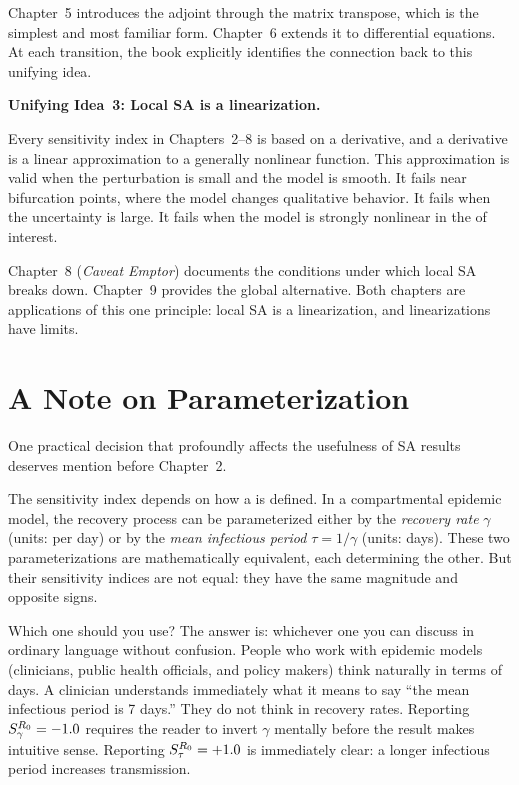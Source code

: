 Chapter~5 introduces the adjoint through the matrix transpose,
which is the simplest and most familiar form. Chapter~6 extends
it to differential equations. At each transition, the book
explicitly identifies the connection back to this unifying idea.

\medskip

\noindent\textbf{Unifying Idea~3: Local SA is a linearization.}

Every sensitivity index in Chapters~2--8 is based on a derivative,
and a derivative is a linear approximation to a generally nonlinear
function. This approximation is valid when the perturbation is small
and the model is smooth. It fails near bifurcation points, where
the model changes qualitative behavior. It fails when the \POI
uncertainty is large. It fails when the model is strongly nonlinear
in the \POI of interest.

Chapter~8 (\emph{Caveat Emptor}) documents the conditions
under which local SA breaks down. Chapter~9 provides
the global alternative. Both chapters are applications
of this one principle: local SA is a linearization,
and linearizations have limits.

\section{A Note on Parameterization}
\label{sec:parameterization}

One practical decision that profoundly affects the usefulness
of SA results deserves mention before Chapter~2.

The sensitivity index depends on how a \POI is defined.
In a compartmental epidemic model, the recovery process can
be parameterized either by the \emph{recovery rate} $\gamma$
(units: per day) or by the \emph{mean infectious period}
$\tau = 1/\gamma$ (units: days). These two parameterizations
are mathematically equivalent, each determining the other.
But their sensitivity indices are not equal: they have
the same magnitude and opposite signs.

Which one should you use? The answer is: whichever one you can
discuss in ordinary language without confusion. People who work
with epidemic models (clinicians, public health officials,
and policy makers) think naturally in terms of days.
A clinician understands immediately what it means to say
``the mean infectious period is 7 days.'' They do not
think in recovery rates. Reporting $S_{\gamma}^{R_0} = -1.0$
requires the reader to invert $\gamma$ mentally before the
result makes intuitive sense. Reporting $S_{\tau}^{R_0} = +1.0$
is immediately clear: a longer infectious period increases
transmission.

